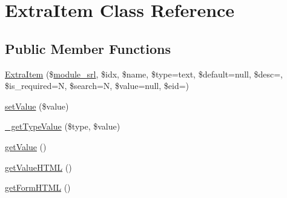 \hypertarget{classExtraItem}{}\section{Extra\+Item Class Reference}
\label{classExtraItem}
\subsection*{Public Member Functions}
\begin{DoxyCompactItemize}
\item 
\hyperlink{classExtraItem_a4b979119759a26802638dc6e8c2c8fb7}{Extra\+Item} (\$\hyperlink{ko_8install_8php_a370bb6450fab1da3e0ed9f484a38b761}{module\+\_\+srl}, \$idx, \$name, \$type=\textquotesingle{}text\textquotesingle{}, \$default=null, \$desc=\textquotesingle{}\textquotesingle{}, \$is\+\_\+required=\textquotesingle{}N\textquotesingle{}, \$search=\textquotesingle{}N\textquotesingle{}, \$value=null, \$eid=\textquotesingle{}\textquotesingle{})
\item 
\hyperlink{classExtraItem_a6bec289dc0622bd882a36cb9b5680b03}{set\+Value} (\$value)
\item 
\hyperlink{classExtraItem_ac285a098cdd05b2c152b3d94c8cb95db}{\+\_\+get\+Type\+Value} (\$type, \$value)
\item 
\hyperlink{classExtraItem_a61ff542aa57144ac9e8d20d40f426486}{get\+Value} ()
\item 
\hyperlink{classExtraItem_a7784f081919e81e4a41ab0c250d6ca52}{get\+Value\+H\+T\+ML} ()
\item 
\hyperlink{classExtraItem_aaedac8843abdf391e8f4d22704606898}{get\+Form\+H\+T\+ML} ()
\end{DoxyCompactItemize}
